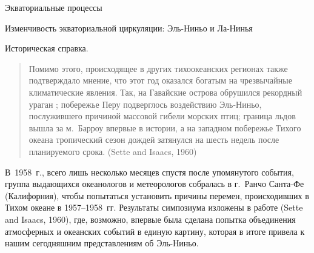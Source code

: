 \begin{chapter}{Экваториальные процессы}
\begin{section}{Изменчивость экваториальной циркуляции: Эль-Ниньо и Ла-Нинья}
\begin{paragraph}{Историческая справка.}
\begin{quotation}
Помимо этого, происходящее в других тихоокеанских регионах также подтверждало
мнение, что этот год оказался богатым на чрезвычайные климатические явления.
Так, на Гавайские острова обрушился рекордный ураган%
;
побережье Перу подверглось воздействию Эль-Ниньо, послужившего причиной 
массовой гибели морских птиц; граница льдов вышла за м.~Барроу впервые 
в истории, а на западном побережье Тихого океана тропический сезон дождей 
затянулся на шесть недель после планируемого 
срока. (Sette and Isaacs, 1960)
%
\end{quotation}

В~1958~г., всего лишь несколько месяцев спустя после упомянутого события, 
группа выдающихся океанологов и метеорологов 
собралась в г.~Ранчо Санта-Фе (Калифорния), чтобы попытаться установить 
причины перемен, происходивших в Тихом океане в 1957--1958~гг. 
Результаты симпозиума изложены в работе (Sette and Isaacs, 1960), где, 
возможно, впервые была сделана попытка объединения атмосферных и океанских 
событий в единую картину, которая в итоге привела к нашим сегодняшним 
представлениям об Эль-Ниньо.
%


\end{paragraph}
\end{section}
\end{chapter}
